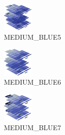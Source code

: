 \hspace{0.1cm}
\begin{minipage}[b]{0.15\linewidth}
\begin{figure}[H]                                                          
  \centering                                                             
  \begin{adjustbox}{width=1.5cm,center}                                   
  \includegraphics[width=1.5cm]{src/colorspace_colourflow/flows/colourflow_133-45.png}%
  \end{adjustbox}                                                        
\caption*{MEDIUM\_BLUE5}                                           
\end{figure}                                                               
\end{minipage}
\hspace{0.1cm}
\begin{minipage}[b]{0.15\linewidth}
\begin{figure}[H]                                                          
  \centering                                                             
  \begin{adjustbox}{width=1.5cm,center}                                   
  \includegraphics[width=1.5cm]{src/colorspace_colourflow/flows/colourflow_134-45.png}%
  \end{adjustbox}                                                        
\caption*{MEDIUM\_BLUE6}                                           
\end{figure}                                                               
\end{minipage}
\hspace{0.1cm}
\begin{minipage}[b]{0.15\linewidth}
\begin{figure}[H]                                                          
  \centering                                                             
  \begin{adjustbox}{width=1.5cm,center}                                   
  \includegraphics[width=1.5cm]{src/colorspace_colourflow/flows/colourflow_135-45.png}%
  \end{adjustbox}                                                        
\caption*{MEDIUM\_BLUE7}                                           
\end{figure}                                                               
\end{minipage}
